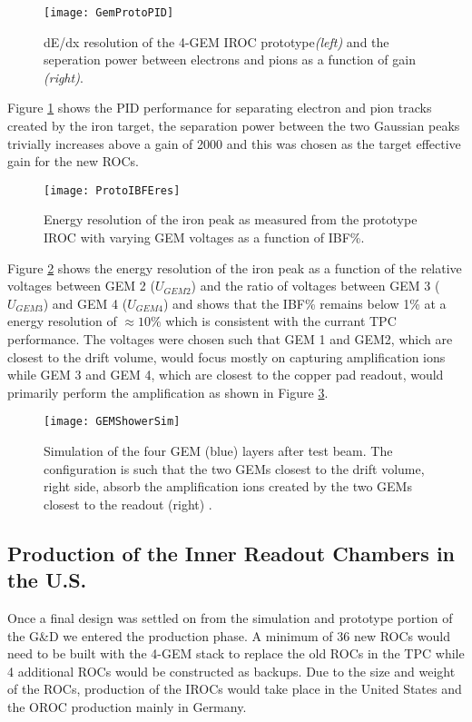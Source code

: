 \begin{figure}[h]
\texttt{[image: GemProtoPID]}
\centering
\caption{dE/dx resolution of the 4-GEM IROC prototype\textit{(left)} and the seperation power between electrons and pions as a function of gain \textit{(right)}\cite{CERN-LHCC-2015-002}.}
\label{fig:GemProtoPID}
\end{figure}

Figure \ref{fig:GemProtoPID} shows the PID performance for separating electron and pion tracks created by the iron target, the separation power between the two Gaussian peaks trivially increases above a gain of 2000 and this was chosen as the target effective gain for the new ROCs.



\begin{figure}[h]
\texttt{[image: ProtoIBFEres]}
\centering
\caption{Energy resolution of the iron peak as measured from the prototype IROC with varying GEM voltages as a function of IBF\%\cite{CERN-LHCC-2015-002}.}
\label{fig:ProtoIBFEres}
\end{figure}

\noindent
Figure \ref{fig:ProtoIBFEres} shows the energy resolution of the iron peak as a function of the relative voltages between GEM 2 ($U_{GEM2}$) and the ratio of voltages between GEM 3 ($U_{GEM3}$) and GEM 4 ($U_{GEM4}$) and shows that the IBF\% remains below 1\% at a energy resolution of $\approx 10\%$ which is consistent with the currant TPC performance.  The voltages were chosen such that GEM 1 and GEM2, which are closest to the drift volume, would focus mostly on capturing amplification ions while GEM 3 and GEM 4, which are closest to the copper pad readout, would primarily perform the amplification as shown in Figure \ref{fig:showersim}.

\begin{figure}[h]
\texttt{[image: GEMShowerSim]}
\centering
\caption{Simulation of the four GEM (blue) layers after test beam.  The configuration is such that the two GEMs closest to the drift volume, right side, absorb the amplification ions created by the two GEMs closest to the readout (right) \cite{CERN-LHCC-2015-002}.}
\label{fig:showersim}
\end{figure}



\subsection{Production of the Inner Readout Chambers in the U.S.}
Once a final design was settled on from the simulation and prototype portion of the G\&D we entered the production phase.  A minimum of 36 new ROCs would need to be built with the 4-GEM stack to replace the old ROCs in the TPC while 4 additional ROCs would be constructed as backups.  Due to the size and weight of the ROCs, production of the IROCs would take place in the United States and the OROC production mainly in Germany. 



